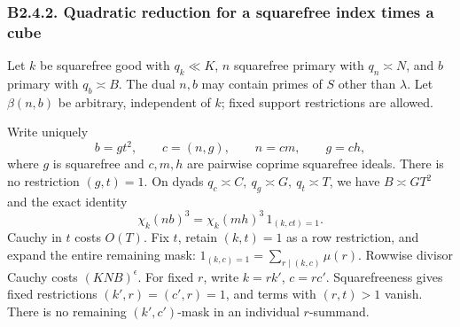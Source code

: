 \documentclass[11pt,a4paper]{article}
\begin{document}
\hypertarget{b2.4.2.-quadratic-reduction-for-a-squarefree-index-times-a-cube}{%
\subsubsection{B2.4.2. Quadratic reduction for a squarefree index times
a
cube}\label{b2.4.2.-quadratic-reduction-for-a-squarefree-index-times-a-cube}}

Let \(k\) be squarefree good with \(q_k\ll K\), \(n\) squarefree primary
with \(q_n\asymp N\), and \(b\) primary with \(q_b\asymp B\). The dual
\(n,\allowbreak{}b\) may contain primes of \(S\) other than \(\lambda\). Let
\(\beta(n,\allowbreak{}b)\) be arbitrary, independent of \(k\); fixed support
restrictions are allowed.

Write uniquely \[
b=gt^2,\qquad c=(n,g),\qquad n=cm,\qquad g=ch,
\] where \(g\) is squarefree and \(c,\allowbreak{}m,\allowbreak{}h\) are pairwise coprime
squarefree ideals. There is no restriction \((g,\allowbreak{}t)=1\). On dyads
\(q_c\asymp C,\allowbreak{}\ q_g\asymp G,\allowbreak{}\ q_t\asymp T\), we have \(B\asymp GT^2\)
and the exact identity \[
\chi_k(nb)^3=\chi_k(mh)^3\,1_{(k,ct)=1}.
\tag{B2.26}
\] Cauchy in \(t\) costs \(O(T)\). Fix \(t\), retain \((k,\allowbreak{}t)=1\) as a
row restriction, and expand the entire remaining mask:
\(1_{(k,\allowbreak{}c)=1}=\sum_{r\mid(k,\allowbreak{}c)}\mu(r)\). Rowwise divisor Cauchy costs
\((KNB)^\epsilon\). For fixed \(r\), write \(k=rk'\), \(c=rc'\).
Squarefreeness gives fixed restrictions \((k',\allowbreak{}r)=(c',\allowbreak{}r)=1\), and terms
with \((r,\allowbreak{}t)>1\) vanish. There is no remaining \((k',\allowbreak{}c')\)-mask in an
individual \(r\)-summand.
\end{document}
